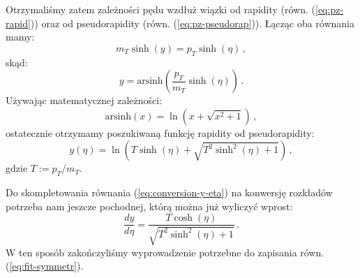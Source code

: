 \documentclass[a4paper,12pt]{article}
\begin{document}
Otrzymaliśmy zatem zależności pędu wzdłuż wiązki od rapidity (równ. (\ref{eq:pz-rapid})) oraz od pseudorapidity (równ. (\ref{eq:pz-pseudorap})). Łącząc oba równania mamy:
\begin{equation} \label{eq:pz-rapid-pseudorapid}
m_{T} \sinh(y) = p_{T} \sinh(\eta)\,,
\end{equation}
skąd:
\begin{equation} \label{eq:rapid-pseudorapid-1}
y = \text{arsinh}\left(\frac{p_{T}}{m_T} \sinh(\eta)\right)\,.
\end{equation}
Używając matematycznej zależności:
\begin{equation} \label{eq:arcsinh}
\text{arsinh}(x) =  \ln\left(x + \sqrt{x^2 + 1} \right) \,,
\end{equation}
ostatecznie otrzymamy poszukiwaną funkcję rapidity od pseudorapidity:
\begin{equation} \label{eq:rapid-pseudorapid}
y(\eta) = \ln\left(T\sinh(\eta) + \sqrt{T^2\sinh^2(\eta) + 1} \right) \,,
\end{equation}
gdzie $T := p_T/m_T$.

Do skompletowania równania (\ref{eq:conversion-y-eta}) na konwersję rozkładów potrzeba nam jeszcze pochodnej, którą można już wyliczyć wprost:
\begin{equation} \label{eq:rapid-pseudorapid-deriv}
\frac{dy}{d\eta} = \frac{T\cosh(\eta)}{\sqrt{T^2\sinh^2(\eta) + 1}} \,.
\end{equation}
W ten sposób zakończyliśmy wyprowadzenie potrzebne do zapisania równ. (\ref{eq:fit-symmetr}).
\end{document}
